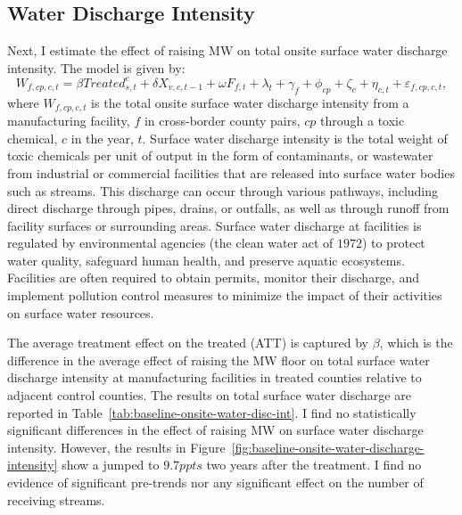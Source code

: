\documentclass[12pt, english]{article}
\begin{document}
    \subsection{Water Discharge Intensity}\label{subsec:water-discharge-intensity}
    Next, I estimate the effect of raising MW on total onsite surface water discharge intensity. The model is given by:
    \begin{equation}
        W_{f,cp,c,t} = \beta Treated_{s,t}^e + \delta X_{v,c,t-1} + \omega F_{f,t} + \lambda_{t} + \gamma_{f} + \phi_{cp} + \zeta_{c} + \eta_{c,t} + \varepsilon_{f,cp,c,t},\label{eq:baseline-onsite-water-discharge-intensity}
    \end{equation}
    where $W_{f,cp,c,t}$ is the total onsite surface water discharge intensity from a manufacturing facility, $f$ in cross-border county pairs, $cp$ through a toxic chemical, $c$ in the year, $t$. Surface water discharge intensity is the total weight of toxic chemicals per unit of output in the form of contaminants, or wastewater from industrial or commercial facilities that are released into surface water bodies such as streams. This discharge can occur through various pathways, including direct discharge through pipes, drains, or outfalls, as well as through runoff from facility surfaces or surrounding areas. Surface water discharge at facilities is regulated by environmental agencies (the clean water act of $1972$) to protect water quality, safeguard human health, and preserve aquatic ecosystems. Facilities are often required to obtain permits, monitor their discharge, and implement pollution control measures to minimize the impact of their activities on surface water resources.

    The average treatment effect on the treated (ATT) is captured by $\beta$, which is the difference in the average effect of raising the MW floor on total surface water discharge intensity at manufacturing facilities in treated counties relative to adjacent control counties. The results on total surface water discharge are reported in Table~\ref{tab:baseline-onsite-water-disc-int}. I find no statistically significant differences in the effect of raising MW on surface water discharge intensity. However, the results in Figure~\ref{fig:baseline-onsite-water-discharge-intensity} show a jumped to $9.7ppts$ two years after the treatment. I find no evidence of significant pre-trends nor any significant effect on the number of receiving streams.
    
    
\end{document}

